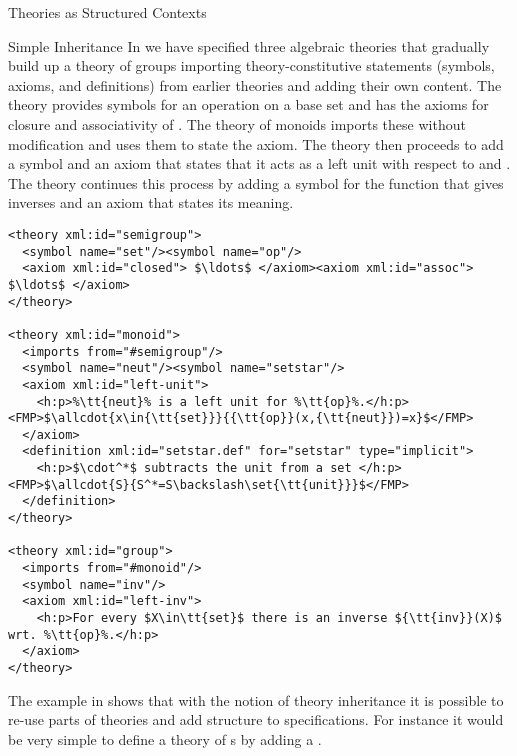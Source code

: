 \begin{omgroup}[short=Mathematical Statements,id=statements]
\begin{omgroup}[id=theories-contexts]{Theories as Structured Contexts}
\begin{module}[id=theories]
\begin{omgroup}[id=inheritance]{Simple Inheritance}
In {} we have specified three algebraic theories that gradually build
up a theory of groups importing theory-constitutive statements (symbols, axioms, and
definitions) from earlier theories and adding their own content. The theory
{} provides symbols for an operation {} on a base set
{} and has the axioms for closure and associativity of
{}. The theory of monoids imports these without modification and uses them
to state the {} axiom. The theory {} then proceeds to
add a symbol {} and an axiom that states that it acts as a left unit with
respect to {} and {}.  The theory {}
continues this process by adding a symbol {} for the function that gives
inverses and an axiom that states its meaning.

\begin{lstlisting}[label=lst:def-group,escapechar=\%,mathescape,
  caption={A Structured Development of Algebraic Theories in {\omdoc}},
  index={theory,symbol,axiom,imports}]
<theory xml:id="semigroup">
  <symbol name="set"/><symbol name="op"/>
  <axiom xml:id="closed"> $\ldots$ </axiom><axiom xml:id="assoc"> $\ldots$ </axiom>
</theory>

<theory xml:id="monoid">
  <imports from="#semigroup"/>
  <symbol name="neut"/><symbol name="setstar"/>
  <axiom xml:id="left-unit">
    <h:p>%\tt{neut}% is a left unit for %\tt{op}%.</h:p><FMP>$\allcdot{x\in{\tt{set}}}{{\tt{op}}(x,{\tt{neut}})=x}$</FMP>
  </axiom>
  <definition xml:id="setstar.def" for="setstar" type="implicit">
    <h:p>$\cdot^*$ subtracts the unit from a set </h:p><FMP>$\allcdot{S}{S^*=S\backslash\set{\tt{unit}}}$</FMP>
  </definition>
</theory>

<theory xml:id="group"> 
  <imports from="#monoid"/>
  <symbol name="inv"/>
  <axiom xml:id="left-inv">
    <h:p>For every $X\in\tt{set}$ there is an inverse ${\tt{inv}}(X)$ wrt. %\tt{op}%.</h:p>
  </axiom>
</theory>
\end{lstlisting}

The example in {} shows that with the notion of theory inheritance it
is possible to re-use parts of theories and add structure to specifications. For instance
it would be very simple to define a theory of {s} by adding a
{}.


\end{omgroup}
\end{module}
\end{omgroup}
\end{omgroup}
